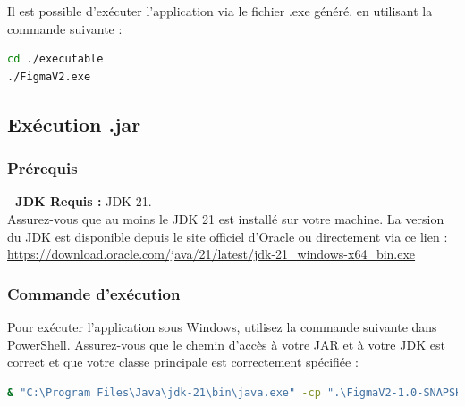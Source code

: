 \documentclass[a4paper,11pt]{article}
\begin{document}
Il est possible d'exécuter l'application via le fichier .exe généré. en utilisant la commande suivante :


\begin{lstlisting}[language=bash,caption={Command execution .exe}]
cd ./executable
./FigmaV2.exe
\end{lstlisting}

\subsection{Exécution .jar}
\subsubsection{Prérequis}

- \textbf{JDK Requis :} JDK 21.\\ Assurez-vous que au moins le JDK 21 est installé sur votre machine. La version du JDK est disponible depuis le site officiel d'Oracle ou directement via ce lien : \url{https://download.oracle.com/java/21/latest/jdk-21_windows-x64_bin.exe}

\subsubsection{Commande d'exécution}

Pour exécuter l'application sous Windows, utilisez la commande suivante dans PowerShell. Assurez-vous que le chemin d'accès à votre JAR et à votre JDK est correct et que votre classe principale est correctement spécifiée :

\begin{lstlisting}[language=bash,caption={Command execution .jar}]
& "C:\Program Files\Java\jdk-21\bin\java.exe" -cp ".\FigmaV2-1.0-SNAPSHOT.jar" thibault.kuraima.Main
\end{lstlisting}

\pagebreak


\end{document}
